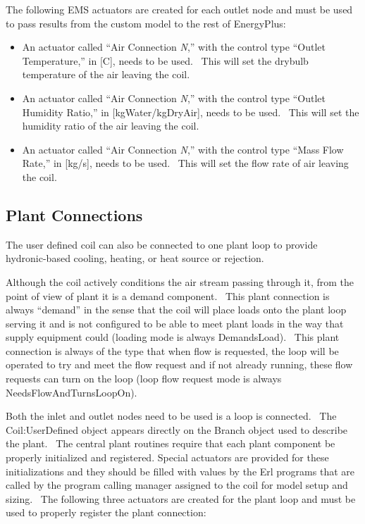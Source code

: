 The following EMS actuators are created for each outlet node and must be used to pass results from the custom model to the rest of EnergyPlus:

\begin{itemize}
\item
  An actuator called ``Air Connection \emph{N},'' with the control type ``Outlet Temperature,'' in {[}C{]}, needs to be used.~ This will set the drybulb temperature of the air leaving the coil.
\item
  An actuator called ``Air Connection \emph{N},'' with the control type ``Outlet Humidity Ratio,'' in {[}kgWater/kgDryAir{]}, needs to be used.~ This will set the humidity ratio of the air leaving the coil.
\item
  An actuator called ``Air Connection \emph{N},'' with the control type ``Mass Flow Rate,'' in {[}kg/s{]}, needs to be used.~ This will set the flow rate of air leaving the coil.
\end{itemize}

\subsection{Plant Connections}\label{plant-connections}

The user defined coil can also be connected to one plant loop to provide hydronic-based cooling, heating, or heat source or rejection.

Although the coil actively conditions the air stream passing through it, from the point of view of plant it is a demand component.~ This plant connection is always ``demand'' in the sense that the coil will place loads onto the plant loop serving it and is not configured to be able to meet plant loads in the way that supply equipment could (loading mode is always DemandsLoad).~ This plant connection is always of the type that when flow is requested, the loop will be operated to try and meet the flow request and if not already running, these flow requests can turn on the loop (loop flow request mode is always NeedsFlowAndTurnsLoopOn).

Both the inlet and outlet nodes need to be used is a loop is connected.~ The Coil:UserDefined object appears directly on the Branch object used to describe the plant.~ The central plant routines require that each plant component be properly initialized and registered. Special actuators are provided for these initializations and they should be filled with values by the Erl programs that are called by the program calling manager assigned to the coil for model setup and sizing.~ The following three actuators are created for the plant loop and must be used to properly register the plant connection:

